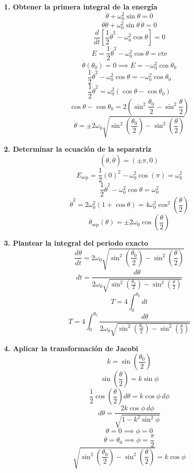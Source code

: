 \documentclass[11pt,a4paper]{article}
\newenvironment{solucion}[1][Solución Detallada]{%
    \vspace{1.5mm}%
    \noindent{\large\textbf{Solución:}}\par\vspace{1.5mm}%
}{%
    \par\vspace{3mm}%
}
\begin{document}
\begin{solucion}

\textbf{\large 1. Obtener la primera integral de la energía}
\[
\ddot{\theta} + \omega_0^2 \sin\theta = 0
\]
\[
\dot{\theta}\ddot{\theta} + \omega_0^2 \sin\theta\,\dot{\theta} = 0
\]
\[
\frac{d}{dt}\left[ \frac{1}{2}\dot{\theta}^2 - \omega_0^2 \cos\theta \right] = 0
\]
\[
\boxed{E = \frac{1}{2}\dot{\theta}^2 - \omega_0^2 \cos\theta = \text{cte}}
\]
\[
\dot{\theta}(\theta_0) = 0 \implies E = -\omega_0^2 \cos\theta_0
\]
\[
\frac{1}{2}\dot{\theta}^2 - \omega_0^2 \cos\theta = -\omega_0^2 \cos\theta_0
\]
\[
\frac{1}{2}\dot{\theta}^2 = \omega_0^2(\cos\theta - \cos\theta_0)
\]
\[
\cos\theta - \cos\theta_0 = 2\left(\sin^2\frac{\theta_0}{2} - \sin^2\frac{\theta}{2}\right)
\]
\[
\boxed{\dot{\theta} = \pm 2\omega_0 \sqrt{\sin^2\left(\frac{\theta_0}{2}\right) - \sin^2\left(\frac{\theta}{2}\right)}}
\]

\vspace{3.5mm}

\textbf{\large 2. Determinar la ecuación de la separatriz}
\[
(\theta, \dot{\theta}) = (\pm\pi, 0)
\]
\[
E_{\text{sep}} = \frac{1}{2}(0)^2 - \omega_0^2 \cos(\pi) = \omega_0^2
\]
\[
\frac{1}{2}\dot{\theta}^2 - \omega_0^2 \cos\theta = \omega_0^2
\]
\[
\dot{\theta}^2 = 2\omega_0^2(1 + \cos\theta) = 4\omega_0^2 \cos^2\left(\frac{\theta}{2}\right)
\]
\[
\boxed{\dot{\theta}_{\text{sep}}(\theta) = \pm 2\omega_0 \cos\left(\frac{\theta}{2}\right)}
\]

\vspace{3.5mm}

\textbf{\large 3. Plantear la integral del periodo exacto}
\[
\frac{d\theta}{dt} = 2\omega_0 \sqrt{\sin^2\left(\frac{\theta_0}{2}\right) - \sin^2\left(\frac{\theta}{2}\right)}
\]
\[
dt = \frac{d\theta}{2\omega_0 \sqrt{\sin^2\left(\frac{\theta_0}{2}\right) - \sin^2\left(\frac{\theta}{2}\right)}}
\]
\[
T = 4 \int_0^{\theta_0} dt
\]
\[
\boxed{T = 4 \int_0^{\theta_0} \frac{d\theta}{2\omega_0 \sqrt{\sin^2\left(\frac{\theta_0}{2}\right) - \sin^2\left(\frac{\theta}{2}\right)}}}
\]

\vspace{3.5mm}

\textbf{\large 4. Aplicar la transformación de Jacobi}
\[
k = \sin\left(\frac{\theta_0}{2}\right)
\]
\[
\sin\left(\frac{\theta}{2}\right) = k \sin\phi
\]
\[
\frac{1}{2}\cos\left(\frac{\theta}{2}\right) d\theta = k \cos\phi\, d\phi
\]
\[
d\theta = \frac{2k\cos\phi\, d\phi}{\sqrt{1 - k^2\sin^2\phi}}
\]
\[
\theta = 0 \implies \phi = 0
\]
\[
\theta = \theta_0 \implies \phi = \frac{\pi}{2}
\]
\[
\sqrt{\sin^2\left(\frac{\theta_0}{2}\right) - \sin^2\left(\frac{\theta}{2}\right)} = k\cos\phi
\]


\end{solucion}
\end{document}
